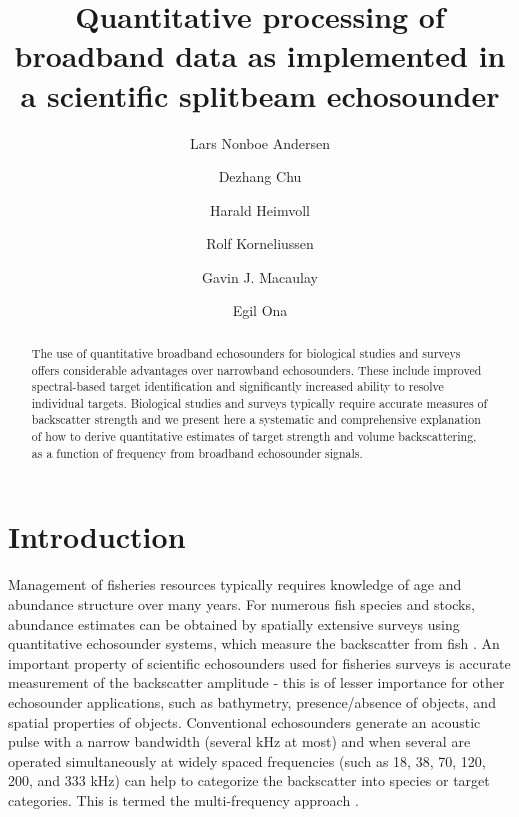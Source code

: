 \documentclass[preprint,12pt,TurnOnLineNumbers]{JASAnew}
\begin{document}
\title[]{Quantitative processing of broadband data as implemented in a scientific splitbeam echosounder}

\author{Lars Nonboe Andersen}

\author{Dezhang Chu}

\author{Harald Heimvoll}

\author{Rolf Korneliussen}
\author{Gavin J. Macaulay}
\author{Egil Ona}

\begin{abstract}
The use of quantitative broadband echosounders for biological studies and surveys offers considerable advantages over narrowband echosounders. These include improved spectral-based target identification and significantly increased ability to resolve individual targets. Biological studies and surveys typically require accurate measures of backscatter strength and we present here a systematic and comprehensive explanation of how to derive quantitative estimates of target strength and volume backscattering, as a function of frequency from broadband echosounder signals.

\end{abstract}

\maketitle


\section{Introduction}

Management of fisheries resources typically requires knowledge of age and abundance structure over many years. For numerous fish species and stocks, abundance estimates can be obtained by spatially extensive surveys using quantitative echosounder systems, which measure the backscatter from fish \citep{Simmonds2005Fisheries}. An important property of scientific echosounders used for fisheries surveys is accurate measurement of the backscatter amplitude - this is of lesser importance for other echosounder applications, such as bathymetry, presence/absence of objects, and spatial properties of objects. Conventional echosounders generate an acoustic pulse with a narrow bandwidth (several kHz at most) and when several are operated simultaneously at widely spaced frequencies (such as 18, 38, 70, 120, 200, and 333 kHz) can help to categorize the backscatter into species or target categories. This is termed the multi-frequency approach \citep{Korneliussen2002operational, holliday1980}.
\end{document}
